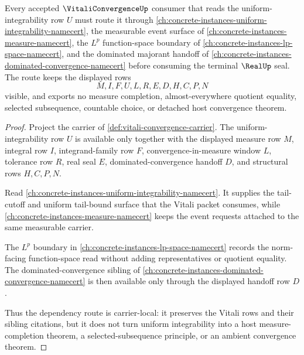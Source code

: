 \begin{theorem}
\label{thm:vitali-convergence-uniform-integrability-dependency-route}
Every accepted $\VitaliConvergenceUp$ consumer that reads the uniform-integrability row $U$ must route it through \autoref{ch:concrete-instances-uniform-integrability-namecert}, the measurable event surface of \autoref{ch:concrete-instances-measure-namecert}, the $L^p$ function-space boundary of \autoref{ch:concrete-instances-lp-space-namecert}, and the dominated majorant handoff of \autoref{ch:concrete-instances-dominated-convergence-namecert} before consuming the terminal $\RealUp$ seal. The route keeps the displayed rows
$$
M,I,F,U,L,R,E,D,H,C,P,N
$$
visible, and exports no measure completion, almost-everywhere quotient equality, selected subsequence, countable choice, or detached host convergence theorem.
\end{theorem}
\begin{proof}
Project the carrier of \autoref{def:vitali-convergence-carrier}. The uniform-integrability row $U$ is available only together with the displayed measure row $M$, integral row $I$, integrand-family row $F$, convergence-in-measure window $L$, tolerance row $R$, real seal $E$, dominated-convergence handoff $D$, and structural rows $H,C,P,N$.

Read \autoref{ch:concrete-instances-uniform-integrability-namecert}. It supplies the tail-cutoff and uniform tail-bound surface that the Vitali packet consumes, while \autoref{ch:concrete-instances-measure-namecert} keeps the event requests attached to the same measurable carrier.

The $L^p$ boundary in \autoref{ch:concrete-instances-lp-space-namecert} records the norm-facing function-space read without adding representatives or quotient equality. The dominated-convergence sibling of \autoref{ch:concrete-instances-dominated-convergence-namecert} is then available only through the displayed handoff row $D$.

Thus the dependency route is carrier-local: it preserves the Vitali rows and their sibling citations, but it does not turn uniform integrability into a host measure-completion theorem, a selected-subsequence principle, or an ambient convergence theorem.
\end{proof}
